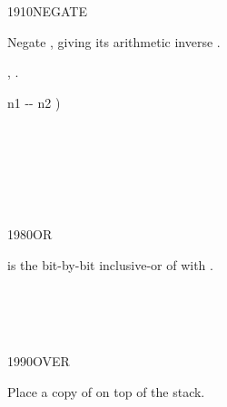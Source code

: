 \enlargethispage{4ex}
\begin{worddef}{1910}{NEGATE}
\item {}

	Negate , giving its arithmetic inverse .

\see {},
	.

	\begin{implement} %
		\word{:}   n1 -{}- n2 ) \\
		\tab {}  \\
		\word{;}
	\end{implement}

	\begin{testing} %
		 \\
		 \\
		 \\
		 \\
	\end{testing}
\end{worddef}


\begin{worddef}{1980}{OR}
\item {}

	 is the bit-by-bit inclusive-or of  with
	.

	\begin{testing} %
		 \\
		 \\
		 \\
	\end{testing}
\end{worddef}

\vspace*{-6ex}
\begin{worddef}{1990}{OVER}
\item {}

	Place a copy of  on top of the stack.

	\begin{testing} %
	\end{testing}
\end{worddef}

